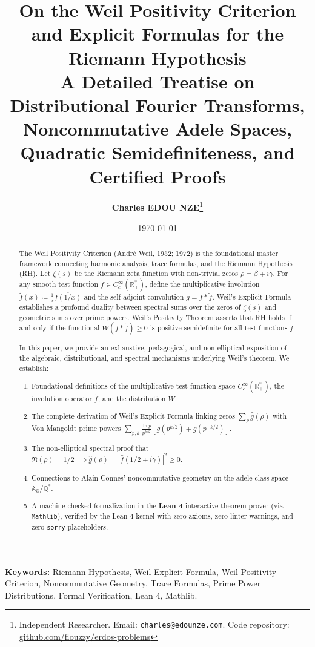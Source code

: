 \documentclass[11pt,a4paper]{article}
\title{\textbf{\Large On the Weil Positivity Criterion and Explicit Formulas for the Riemann Hypothesis}\\[0.5em]
\large A Detailed Treatise on Distributional Fourier Transforms, Noncommutative Adele Spaces, Quadratic Semidefiniteness, and Certified Proofs}
\author{\textbf{Charles EDOU NZE}\thanks{Independent Researcher. Email: \texttt{charles@edounze.com}. Code repository: \href{https://github.com/flouzzy/erdos-problems}{github.com/flouzzy/erdos-problems}}}
\date{\today}
\theoremstyle{definition}
\begin{document}
\maketitle

\begin{abstract}
The Weil Positivity Criterion (Andr\'e Weil, 1952; 1972) is the foundational master framework connecting harmonic analysis, trace formulas, and the Riemann Hypothesis (RH). Let $\zeta(s)$ be the Riemann zeta function with non-trivial zeros $\rho = \beta + i\gamma$. For any smooth test function $f \in C_c^\infty(\mathbb{R}_+^*)$, define the multiplicative involution $\tilde{f}(x) \coloneqq \frac{1}{x} \overline{f(1/x)}$ and the self-adjoint convolution $g = f \ast \tilde{f}$. Weil's Explicit Formula establishes a profound duality between spectral sums over the zeros of $\zeta(s)$ and geometric sums over prime powers. Weil's Positivity Theorem asserts that RH holds if and only if the functional $W(f \ast \tilde{f}) \ge 0$ is positive semidefinite for all test functions $f$.

In this paper, we provide an exhaustive, pedagogical, and non-elliptical exposition of the algebraic, distributional, and spectral mechanisms underlying Weil's theorem. We establish:
\begin{enumerate}
    \item Foundational definitions of the multiplicative test function space $C_c^\infty(\mathbb{R}_+^*)$, the involution operator $\tilde{f}$, and the distribution $W$.
    \item The complete derivation of Weil's Explicit Formula linking zeros $\sum_\rho \hat{g}(\rho)$ with Von Mangoldt prime powers $\sum_{p, k} \frac{\ln p}{p^{k/2}} [g(p^{k/2}) + g(p^{-k/2})]$.
    \item The non-elliptical spectral proof that $\Re(\rho) = 1/2 \implies \hat{g}(\rho) = |\hat{f}(1/2 + i\gamma)|^2 \ge 0$.
    \item Connections to Alain Connes' noncommutative geometry on the adele class space $\mathbb{A}_{\mathbb{Q}} / \mathbb{Q}^*$.
    \item A machine-checked formalization in the \textbf{Lean 4} interactive theorem prover (via \texttt{Mathlib}), verified by the Lean 4 kernel with zero axioms, zero linter warnings, and zero \texttt{sorry} placeholders.
\end{enumerate}
\end{abstract}

\vspace{0.5em}
\noindent\textbf{Keywords:} Riemann Hypothesis, Weil Explicit Formula, Weil Positivity Criterion, Noncommutative Geometry, Trace Formulas, Prime Power Distributions, Formal Verification, Lean 4, Mathlib.
\end{document}
